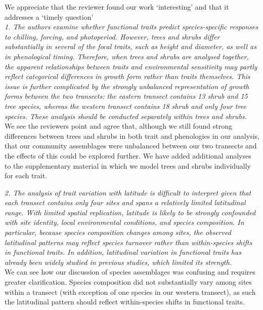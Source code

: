 \documentclass[11pt,a4paper]{article}
\begin{document}
We appreciate that the reviewer found our work `interesting' and that it addresses a `timely question'\\

\emph{1. The authors examine whether functional traits predict species-specific responses to chilling, forcing, and photoperiod. However, trees and shrubs differ substantially in several of the focal traits, such as height and diameter, as well as in phenological timing. Therefore, when trees and shrubs are analysed together, the apparent relationships between traits and environmental sensitivity may partly reflect categorical differences in growth form rather than traits themselves. This issue is further complicated by the strongly unbalanced representation of growth forms between the two transects: the eastern transect contains 13 shrub and 15 tree species, whereas the western transect contains 18 shrub and only four tree species. These analysis should be conducted separately within trees and shrubs.}\\

We see the reviewers point and agree that, although we still found strong differences between trees and shrubs in both trait and phenologies in our analysis, that our community assemblages were unbalanced between our two transects and the effects of this could be explored further. We have added additional analyses to the supplementary material in which we model trees and shrubs individually for each trait.

\emph{2. The analysis of trait variation with latitude is difficult to interpret given that each transect contains only four sites and spans a relatively limited latitudinal range. With limited spatial replication, latitude is likely to be strongly confounded with site identity, local environmental conditions, and species composition. In particular, because species composition changes among sites, the observed latitudinal patterns may reflect species turnover rather than within-species shifts in functional traits. In addition, latitudinal variation in functional traits has already been widely studied in previous studies, which limited its strength.}\\

We can see how our discussion of species assemblages was confusing and requires greater clarification. Species composition did not substantially vary among sites within a transect (with exception of one species in our western transect), as such the latitudinal pattern should reflect within-species shifts in functional traits. \\
\end{document}

